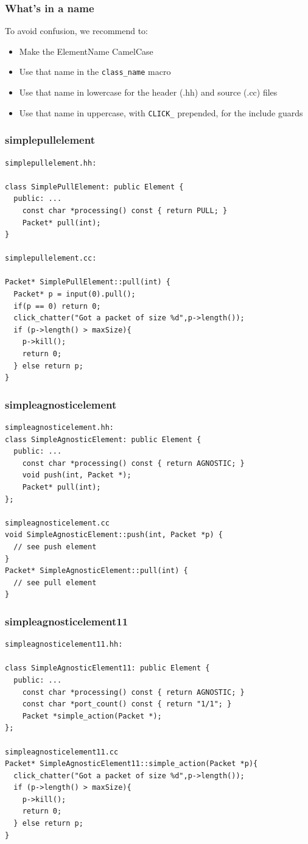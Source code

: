 \documentclass{beamer}
\begin{document}
\begin{frame}[fragile]
\frametitle{What's in a name}
To avoid confusion, we recommend to:
\begin{itemize}
	\item Make the ElementName CamelCase
	\item Use that name in the \lstinline!class_name! macro
	\item Use that name in lowercase for the header (.hh) and source (.cc) files
	\item Use that name in uppercase, with \lstinline!CLICK_! prepended, for the include guards
\end{itemize}
\end{frame}

\begin{frame}[fragile]
\frametitle{simplepullelement}
\begin{lstlisting}[basicstyle=\scriptsize]
simplepullelement.hh:

class SimplePullElement: public Element { 
  public: ...
    const char *processing() const { return PULL; }
    Packet* pull(int);
}

simplepullelement.cc:

Packet* SimplePullElement::pull(int) {
  Packet* p = input(0).pull();
  if(p == 0) return 0;
  click_chatter("Got a packet of size %d",p->length());
  if (p->length() > maxSize){
    p->kill();
    return 0;
  } else return p;
}
\end{lstlisting}
\end{frame}

\begin{frame}[fragile]
\frametitle{simpleagnosticelement}
\begin{lstlisting}[basicstyle=\footnotesize,emph={AGNOSTIC},emphstyle=\underbar]
simpleagnosticelement.hh:
class SimpleAgnosticElement: public Element { 
  public: ...
    const char *processing() const { return AGNOSTIC; }
    void push(int, Packet *);
    Packet* pull(int);
};

simpleagnosticelement.cc
void SimpleAgnosticElement::push(int, Packet *p) {
  // see push element
}
Packet* SimpleAgnosticElement::pull(int) {
  // see pull element
}
\end{lstlisting}
\end{frame}

\begin{frame}[fragile]
\frametitle{simpleagnosticelement11}
\begin{lstlisting}[basicstyle=\scriptsize, emph={AGNOSTIC,simple_action},emphstyle=\underbar]
simpleagnosticelement11.hh:

class SimpleAgnosticElement11: public Element { 
  public: ...
    const char *processing() const { return AGNOSTIC; }
    const char *port_count() const { return "1/1"; }
    Packet *simple_action(Packet *);
};

simpleagnosticelement11.cc
Packet* SimpleAgnosticElement11::simple_action(Packet *p){
  click_chatter("Got a packet of size %d",p->length());
  if (p->length() > maxSize){
    p->kill();
    return 0;
  } else return p;
}
\end{lstlisting}
\end{frame}
\end{document}
